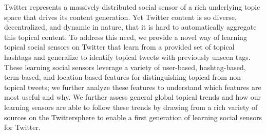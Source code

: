 Twitter represents a massively distributed social sensor of a rich underlying topic space that drives its content generation.  Yet Twitter content is so diverse, decentralized, and dynamic in nature, that it is hard to automatically aggregate this topical content.  To address this need, we provide a novel way of learning topical social sensors on Twitter that learn from a provided set of topical hashtags and generalize to identify topical tweets with previously unseen tags.  These learning social sensors leverage a variety of user-based, hashtag-based, term-based, and location-based features for distinguishing topical from non-topical tweets; we further analyze these features to understand which features are most useful and why.  We further assess general global topical trends and how our learning sensors are able to follow these trends by drawing from a rich variety of sources on the Twittersphere to enable a first generation of learning social sensors for Twitter. 